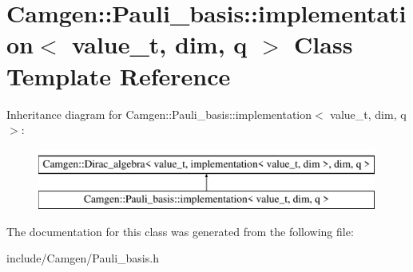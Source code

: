 \hypertarget{a00293}{\section{Camgen\-:\-:Pauli\-\_\-basis\-:\-:implementation$<$ value\-\_\-t, dim, q $>$ Class Template Reference}
\label{a00293}
}
Inheritance diagram for Camgen\-:\-:Pauli\-\_\-basis\-:\-:implementation$<$ value\-\_\-t, dim, q $>$\-:\begin{figure}[H]
\begin{center}
\leavevmode
\includegraphics[height=2.000000cm]{a00293}
\end{center}
\end{figure}


The documentation for this class was generated from the following file\-:\begin{DoxyCompactItemize}
\item 
include/\-Camgen/Pauli\-\_\-basis.\-h\end{DoxyCompactItemize}

